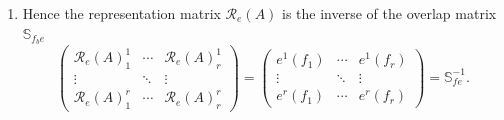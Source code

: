 \documentclass[aps,preprint]{revtex4}
\begin{document}
\begin{enumerate}
\begin{enumerate}
\begin{equation}
^{t}=\left[ \left( 
\begin{array}{c}
e_{b1} \\ 
\vdots \\ 
e_{br}%
\end{array}%
\right) \right] \left( 
\begin{array}{ccc}
f_{1} & \cdots & f_{r}%
\end{array}%
\right) =\left( 
\begin{array}{ccc}
e_{b1}\left( f_{1}\right) & \cdots & e_{b1}\left( f_{1}\right) \\ 
\vdots & \ddots & \vdots \\ 
e_{br}\left( f_{1}\right) & \cdots & e_{br}\left( f_{1}\right)%
\end{array}%
\right) =\left( 
\begin{array}{ccc}
e^{1}\left( f_{1}\right) & \cdots & e^{1}\left( f_{r}\right) \\ 
\vdots & \ddots & \vdots \\ 
e^{r}\left( f_{1}\right) & \cdots & e^{r}\left( f_{r}\right)%
\end{array}%
\right) .
\end{equation}

\item Hence the representation matrix $\mathcal{R}_{e}\left( A\right) $ is
the inverse of the overlap matrix $\mathbb{S}_{f_{b}e}$ 
\begin{equation}
\left( 
\begin{array}{ccc}
\mathcal{R}_{e}\left( A\right) _{1}^{1} & \cdots & \mathcal{R}_{e}\left(
A\right) _{r}^{1} \\ 
\vdots & \ddots & \vdots \\ 
\mathcal{R}_{e}\left( A\right) _{1}^{r} & \cdots & \mathcal{R}_{e}\left(
A\right) _{r}^{r}%
\end{array}%
\right) =\left( 
\begin{array}{ccc}
e^{1}\left( f_{1}\right) & \cdots & e^{1}\left( f_{r}\right) \\ 
\vdots & \ddots & \vdots \\ 
e^{r}\left( f_{1}\right) & \cdots & e^{r}\left( f_{r}\right)%
\end{array}%
\right) =\mathbb{S}_{fe}^{-1}.
\end{equation}


\end{enumerate}
\end{enumerate}
\end{document}
